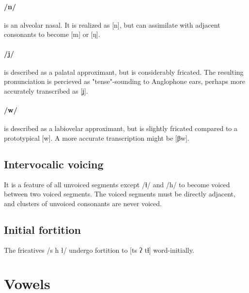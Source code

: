 \documentclass[smallroyalvopaper,9pt]{memoir} %
\newcommand{\bind}{\symbol{"0361}}
\begin{document}
\paragraph{/n/} is an alveolar nasal. It is realized as [n], but can assimilate with adjacent consonants to become [m] or [ŋ]. 

\paragraph{/j/} is described as a palatal approximant, but is considerably fricated. The resulting pronunciation is percieved as "tense"-sounding to Anglophone ears, perhaps more accurately transcribed as [ʝ].

\paragraph{/w/} is described as a labiovelar approximant, but is slightly fricated compared to a prototypical [w]. A more accurate transcription might be [β\bind{}w].

\subsection{Intervocalic voicing} \label{intervocalic}

It is a feature of all unvoiced segments except /ɬ/ and /h/ to become voiced between two voiced segments. The voiced segments must be directly adjacent, and clusters of unvoiced consonants are never voiced.


\subsection{Initial fortition} \label{initfort}

The fricatives /s h ł/ undergo fortition to [t\bind{}s ʔ t\bind{}ɬ] word-initially.




\newpage
\section{Vowels}
\end{document}
